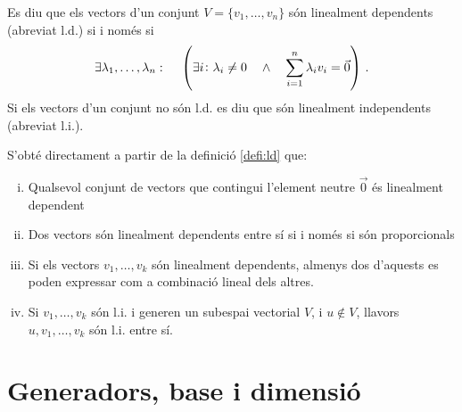 \begin{defi}\label{defi:ld}
	Es diu que els vectors d'un conjunt $ V = \{v_1, \ldots, v_n\}$ són linealment dependents (abreviat l.d.) si i només si \[\exists \lambda_1, \ldots, \lambda_n\operatorname{\colon\quad} \left(\exists i \colon \lambda_i \ne 0 \quad\land\quad \sum_{i=1}^{n} \lambda_i v_i = \vec{0}\right)\,. \] Si els vectors d'un conjunt no són l.d. es diu que són linealment independents (abreviat l.i.).
	
	\begin{col}
		S'obté directament a partir de la definició \ref{defi:ld} que:
		\begin{enumerate}[i)]
			\item Qualsevol conjunt de vectors que contingui l'element neutre $\vec{0}$ és linealment dependent
			\item Dos vectors són linealment dependents entre sí si i només si són proporcionals
			\item Si els vectors $v_1, \ldots, v_k$ són linealment dependents, almenys dos d'aquests es poden expressar com a combinació lineal dels altres.
			\item Si $v_1, \ldots, v_k$ són l.i. i generen un subespai vectorial $V$, i $u\notin V$, llavors $u, v_1, \ldots, v_k$ són l.i. entre sí.
		\end{enumerate}
	\end{col}
\end{defi}


\section{Generadors, base i dimensió}

